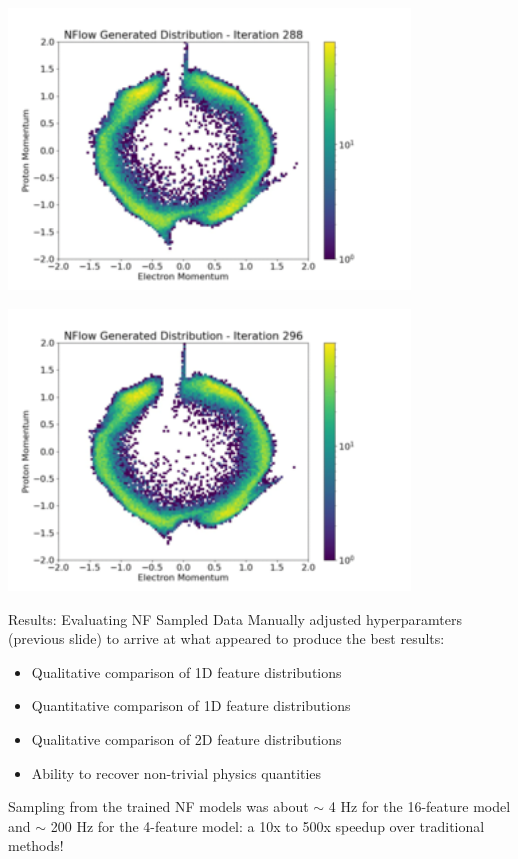\documentclass[aspectratio=169]{beamer}
\begin{document}
\begin{frame}[noframenumbering]\centering\includegraphics[width=0.8\textwidth]{images/400training/400training-36.png}\end{frame}
\begin{frame}[noframenumbering]\centering\includegraphics[width=0.8\textwidth]{images/400training/400training-37.png}\end{frame}
\fi


\begin{frame}{Results: Evaluating NF Sampled Data}
    Manually adjusted hyperparamters (previous slide) to arrive at what appeared to produce the best results:
            \begin{itemize}
                    \setlength\itemsep{0.3em}
                    \item Qualitative comparison of 1D feature distributions
                    \item Quantitative comparison of 1D feature distributions
                    \item Qualitative comparison of 2D feature distributions
                    \item Ability to recover non-trivial physics quantities
            \end{itemize}
    Sampling from the trained NF models was about $\sim$ 4 Hz for the 16-feature model and $\sim$ 200 Hz for the 4-feature model: a 10x to 500x speedup over traditional methods!
   
\end{frame}
\end{document}
